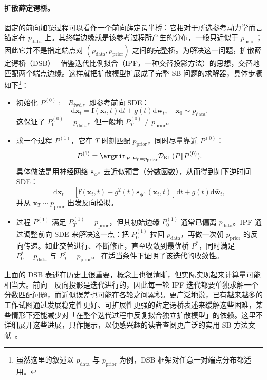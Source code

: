 \paragraph{扩散薛定谔桥。}
固定的前向加噪过程可以看作一个前向薛定谔半桥：它相对于所选参考动力学而言锚定在 $p_{\mathrm{data}}$ 上。其终端边缘就是该参考过程所产生的分布，一般只近似于
$p_{\mathrm{prior}}$；因此它并不是指定端点对 $(p_{\mathrm{data}},p_{\mathrm{prior}})$ 之间的完整桥。为解决这一问题，扩散薛定谔桥（DSB）~\citep{de2021diffusion} 借鉴迭代比例拟合（IPF，一种交替投影方法）的思想，交替地匹配两个端点边缘。这样就把扩散模型扩展成了完整 SB 问题的求解器，具体步骤如下\footnote{虽然这里的叙述以 $p_{\mathrm{data}}$ 与 $p_{\mathrm{prior}}$ 为例，DSB 框架对任意一对端点分布都适用。}：

\begin{itemize}
    \item {} 初始化 $P^{(0)} := R_{\text{fwd}}$，即参考前向 SDE：
    \[
        \mathrm{d} \mathbf{x}_t = \mathbf{f}(\mathbf{x}_t, t)   \mathrm{d} t + g(t)   \mathrm{d} \mathbf{w}_t, \quad \mathbf{x}_0 \sim p_{\text{data}}.
    \]
    这保证了 $P_0^{(0)} = p_{\text{data}}$，但一般地 $P_T^{(0)} \neq p_{\text{prior}}$。

    \item {} 求一个过程 $P^{(1)}$，它在 $T$ 时刻匹配 $p_{\text{prior}}$，同时尽量靠近 $P^{(0)}$：
    \[
        P^{(1)} = \argmin_{P : P_T = p_{\text{prior}}} \mathcal{D}_{\text{KL}}(P  \|  P^{(0)}).
    \]
    具体做法是用神经网络 $\mathbf{s}_{\bm{\phi}^\times}$ 去近似预言（分数函数），从而得到如下逆时间 SDE：
    \[
        \mathrm{d} \mathbf{x}_t = \left[ \mathbf{f}(\mathbf{x}_t, t) - g^2(t) \mathbf{s}_{\bm{\phi}^\times}(\mathbf{x}_t, t) \right] \mathrm{d} t + g(t)  \mathrm{d} \bar{\mathbf{w}}_t,
    \]
    并从 $\mathbf{x}_T \sim p_{\text{prior}}$ 出发反向模拟。

    \item {} 过程 $P^{(1)}$ 满足 $P_T^{(1)} = p_{\text{prior}}$，但其初始边缘 $P_0^{(1)}$ 通常已偏离 $p_{\text{data}}$。IPF 通过调整前向 SDE 来解决这一点：把 $P_0^{(1)}$ 拉回 $p_{\text{data}}$，再做一次朝 $p_{\text{prior}}$ 的反向传递。如此交替进行、不断修正，直至收敛到最优桥 $P^*$，同时满足 $P_0^* = p_{\text{data}}$ 与 $P_T^* = p_{\text{prior}}$。\citet{de2021diffusion} 在适当条件下证明了该迭代的收敛性。
\end{itemize}


上面的 DSB 表述在历史上很重要，概念上也很清晰，但实际实现起来计算量可能相当大。前向—反向投影是迭代进行的，因此每一轮 IPF 迭代都要单独求解一个分数匹配问题，而近似误差也可能在各轮之间累积。更广泛地说，已有越来越多的工作试图通过发展稳定性更好、可扩展性更强的薛定谔桥表述来缓解这些困难，某些情形下还能减少对「在整个迭代过程中反复拟合独立扩散模型」的依赖。这里不详细展开这些进展，只作提示，以便感兴趣的读者查阅更广泛的实用 SB 方法文献~\citep{shi2023dsbm,liu2024gsbm}。


